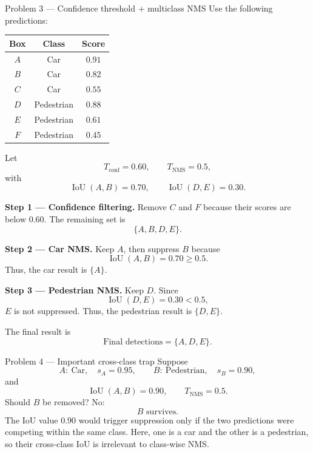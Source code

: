 \documentclass[11pt]{article}
\begin{document}
\begin{practicebox}{Problem 3 --- Confidence threshold + multiclass NMS}
Use the following predictions:

\begin{center}
\begin{tabular}{ccc}
\toprule
\textbf{Box} & \textbf{Class} & \textbf{Score} \\
\midrule
\(A\) & Car & \(0.91\) \\
\(B\) & Car & \(0.82\) \\
\(C\) & Car & \(0.55\) \\
\(D\) & Pedestrian & \(0.88\) \\
\(E\) & Pedestrian & \(0.61\) \\
\(F\) & Pedestrian & \(0.45\) \\
\bottomrule
\end{tabular}
\end{center}

Let
\[
T_{\mathrm{conf}}=0.60,
\qquad
T_{\mathrm{NMS}}=0.5,
\]
with
\[
\operatorname{IoU}(A,B)=0.70,
\qquad
\operatorname{IoU}(D,E)=0.30.
\]

\textbf{Step 1 --- Confidence filtering.} Remove \(C\) and \(F\) because their scores are below \(0.60\). The remaining set is
\[
\{A,B,D,E\}.
\]

\textbf{Step 2 --- Car NMS.} Keep \(A\), then suppress \(B\) because
\[
\operatorname{IoU}(A,B)=0.70\geq0.5.
\]
Thus, the car result is \(\{A\}\).

\textbf{Step 3 --- Pedestrian NMS.} Keep \(D\). Since
\[
\operatorname{IoU}(D,E)=0.30<0.5,
\]
\(E\) is not suppressed. Thus, the pedestrian result is \(\{D,E\}\).

The final result is
\[
\boxed{\text{Final detections}=\{A,D,E\}}.
\]
\end{practicebox}

\begin{practicebox}{Problem 4 --- Important cross-class trap}
Suppose
\[
A:\ \text{Car},\quad s_A=0.95,
\qquad
B:\ \text{Pedestrian},\quad s_B=0.90,
\]
and
\[
\operatorname{IoU}(A,B)=0.90,
\qquad
T_{\mathrm{NMS}}=0.5.
\]
Should \(B\) be removed? No:
\[
\boxed{B\text{ survives}}.
\]
The IoU value \(0.90\) would trigger suppression only if the two predictions were competing within the same class. Here, one is a car and the other is a pedestrian, so their cross-class IoU is irrelevant to class-wise NMS.
\end{practicebox}
\end{document}
